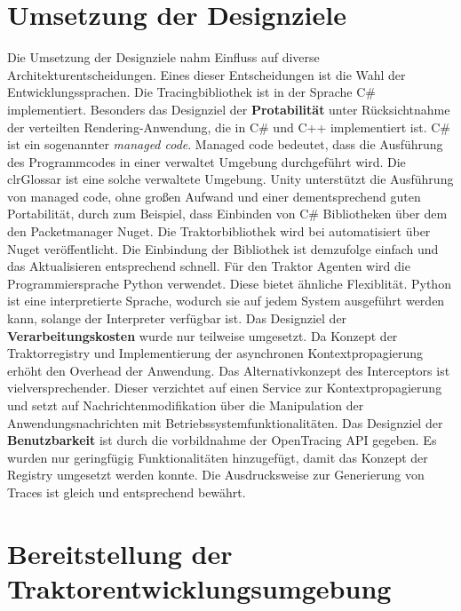 \section{Umsetzung der Designziele}
\label{section:Umsetzung der Designziele}

Die Umsetzung der Designziele nahm Einfluss auf diverse Architekturentscheidungen. Eines dieser Entscheidungen ist die Wahl der Entwicklungssprachen. Die Tracingbibliothek ist in der Sprache C\# implementiert. Besonders das Designziel der \textbf{Protabilität} unter Rücksichtnahme der verteilten Rendering-Anwendung, die in C\# und C++ implementiert ist. C\# ist ein sogenannter \emph{managed code}. Managed code bedeutet, dass die Ausführung des Programmcodes in einer verwaltet Umgebung durchgeführt wird. Die \gls{clrGlossar} ist eine solche verwaltete Umgebung. Unity unterstützt die Ausführung von managed code, ohne großen Aufwand und einer dementsprechend guten Portabilität, durch zum Beispiel, dass Einbinden von C\# Bibliotheken über dem den Packetmanager Nuget. Die Traktorbibliothek wird bei automatisiert über Nuget veröffentlicht. Die Einbindung der Bibliothek ist demzufolge einfach und das Aktualisieren entsprechend schnell. Für den Traktor Agenten wird die Programmiersprache Python verwendet. Diese bietet ähnliche Flexiblität. Python ist eine interpretierte Sprache, wodurch sie auf jedem System ausgeführt werden kann, solange der Interpreter verfügbar ist.
Das Designziel der \textbf{Verarbeitungskosten} wurde nur teilweise umgesetzt. Da Konzept der Traktorregistry und Implementierung der asynchronen Kontextpropagierung erhöht den Overhead der Anwendung. Das Alternativkonzept des Interceptors ist vielversprechender. Dieser verzichtet auf einen Service zur Kontextpropagierung und setzt auf Nachrichtenmodifikation über die Manipulation der Anwendungsnachrichten mit Betriebssystemfunktionalitäten. Das Designziel der \textbf{Benutzbarkeit} ist durch die vorbildnahme der OpenTracing API gegeben. Es wurden nur geringfügig Funktionalitäten hinzugefügt, damit das Konzept der Registry umgesetzt werden konnte. Die Ausdrucksweise zur Generierung von Traces ist gleich und entsprechend bewährt.



\section{Bereitstellung der Traktorentwicklungsumgebung}
\label{section:Bereitstellung der Traktorentwicklungsumgebung}

